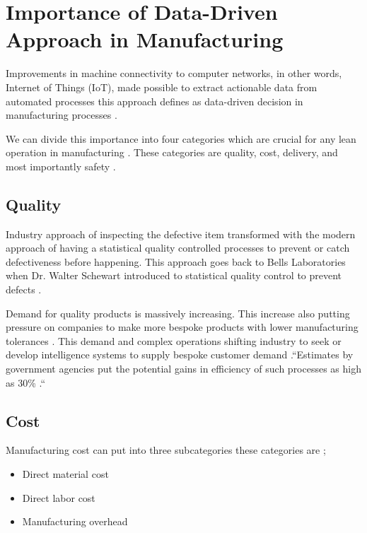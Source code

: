 \documentclass[sigconf]{acmart}
\begin{document}

\section{Importance of Data-Driven Approach in Manufacturing}

Improvements in machine connectivity to computer networks, in other words, Internet of Things (IoT), made possible to extract actionable data from automated processes this approach defines as data-driven decision in manufacturing processes \cite{data-driven, HE2017}.

\par We can divide this importance into four categories which are crucial for any lean operation in manufacturing \cite{www-leanblog}. These categories are quality, cost, delivery, and most importantly safety \cite{www-leanblog}.


\subsection{Quality}

Industry approach of inspecting the defective item transformed with the modern approach of having a statistical quality controlled processes to prevent or catch defectiveness before happening. This approach goes back to Bells Laboratories when Dr. Walter Schewart introduced to statistical quality control to prevent defects \cite{yusof1998}.

\par Demand for quality products is massively increasing. This increase also putting pressure on companies to make more bespoke products with lower manufacturing tolerances \cite{OLIFF2017167}. This demand and complex operations shifting industry to seek or develop intelligence systems to supply bespoke customer demand \cite{OLIFF2017167}.``Estimates by government agencies put the potential gains in efficiency of such processes as high as 30\% \cite{OLIFF2017167}.`` 

\subsection{Cost}
Manufacturing cost can put into three subcategories these categories are \cite{www-wikipedia};

\begin{itemize}
    \item Direct material cost
    \item Direct labor cost
    \item Manufacturing overhead
\end{itemize}
\end{document}
